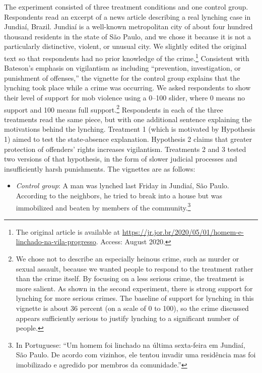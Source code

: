 \documentclass[12pt,a4paper]{article}
\providecommand{\tightlist}{%
   \setlength{\itemsep}{0pt}\setlength{\parskip}{0pt}}
\begin{document}
The experiment consisted of three treatment conditions and one control group. Respondents read an excerpt of a news article describing a real lynching case in Jundia\'{i}, Brazil. Jundia\'{i} is a well-known metropolitan city of about four hundred thousand residents in the state of S\~{a}o Paulo, and we chose it because it is not a particularly distinctive, violent, or unusual city. We slightly edited the original text so that respondents had no prior knowledge of the crime.\footnote{The original article is available at \url{https://jr.jor.br/2020/05/01/homem-e-linchado-na-vila-progresso}. Access: August 2020.} Consistent with Bateson's \citeyearpar[3]{bateson2020politics} emphasis on vigilantism as including ``prevention, investigation, or punishment of offenses,'' the vignette for the control group explains that the lynching took place while a crime was occurring. We asked respondents to show their level of support for mob violence using a 0--100 slider, where 0 means no support and 100 means full support.\footnote{We chose not to describe an especially heinous crime, such as murder or sexual assault, because we wanted people to respond to the treatment rather than the crime itself. By focusing on a less serious crime, the treatment is more salient. As shown in the second experiment, there is strong support for lynching for more serious crimes. The baseline of support for lynching in this vignette is about 36 percent (on a scale of 0 to 100), so the crime discussed appears sufficiently serious to justify lynching to a significant number of people.} Respondents in each of the three treatments read the same piece, but with one additional sentence explaining the motivations behind the lynching. Treatment 1 (which is motivated by Hypothesis 1) aimed to test the state-absence explanation. Hypothesis 2 claims that greater protection of offenders' rights increases vigilantism. Treatments 2 and 3 tested two versions of that hypothesis, in the form of slower judicial processes and insufficiently harsh punishments. The vignettes are as follows:

\begin{itemize}
\tightlist
\item
  \emph{Control group}: A man was lynched last Friday in Jundiaí, São Paulo. According to the neighbors, he tried to break into a house but was immobilized and beaten by members of the community.\footnote{In Portuguese: ``Um homem foi linchado na última sexta-feira em Jundiaí, São Paulo. De acordo com vizinhos, ele tentou invadir uma residência mas foi imobilizado e agredido por membros da comunidade.''}
\end{itemize}
\end{document}

